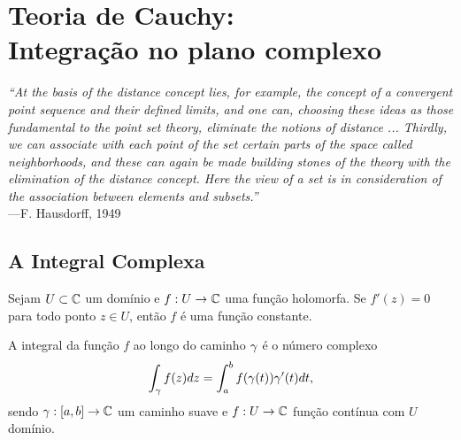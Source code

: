\chapter[Teoria de Cauchy]{Teoria de Cauchy:\\ Integração no plano complexo}
\chaptermark{}


\hfill%
\begin{minipage}{12cm}
	\begin{flushright}
		\rightskip=0.5cm
		\textit{``At the basis of the distance concept lies, for example, 
		the concept of a convergent point sequence and their defined limits,
		and one can, choosing these ideas as those fundamental to the point 
		set theory, eliminate the notions of distance ... Thirdly, 
		we can associate with each point of the set certain parts of the space
		called neighborhoods, and these can again be made building stones of the 
		theory with the elimination of the distance concept. Here the view
		of a set is in consideration of the association between elements and
		subsets.''}
		\\[0.1cm]
		\rightskip=0.5cm
		---F. Hausdorff, 1949
	\end{flushright}
\end{minipage}



\section{A Integral Complexa}

\begin{lema}
Sejam $U \subset \mathbb{C}$ um domínio e $f:U \to \mathbb{C}$ uma função holomorfa. Se $f'(z) = 0$ para
todo ponto $z\in U$, então $f$ é uma função constante.
\end{lema}

\begin{definicao}
\label{def:integral-complexa}
A integral da função $f$ ao longo do caminho $\gamma$ é
o número complexo
\begin{equation*}
    \int_{\gamma} f(z) dz = \int_a^b f(\gamma(t))\gamma'(t) dt,
\end{equation*}
sendo $\gamma:[a,b]\to\mathbb{C}$ um caminho suave e
$f:U \to \mathbb{C}$ função contínua com $U$ domínio.
\end{definicao}

